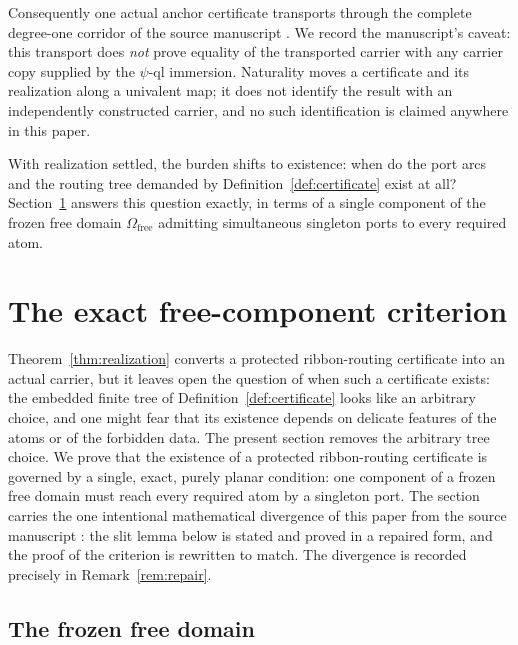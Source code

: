 \documentclass[11pt,reqno]{amsart}
\theoremstyle{definition}
\theoremstyle{remark}
\newcommand{\Omfree}{\Omega_{\mathrm{free}}}
\begin{document}
Consequently one actual anchor certificate transports through the
complete degree-one corridor of the source manuscript \cite{MWman}.  We
record the manuscript's caveat: this transport does \emph{not} prove
equality of the transported carrier with any carrier copy supplied by the
$\psi$-ql immersion.  Naturality moves a certificate and its realization
along a univalent map; it does not identify the result with an
independently constructed carrier, and no such identification is claimed
anywhere in this paper.

With realization settled, the burden shifts to existence: when do the
port arcs and the routing tree demanded by
Definition~\ref{def:certificate} exist at all?
Section~\ref{sec:criterion} answers this question exactly, in terms of a
single component of the frozen free domain $\Omfree$ admitting
simultaneous singleton ports to every required atom.


\section{The exact free-component criterion}\label{sec:criterion}

Theorem~\ref{thm:realization} converts a protected ribbon-routing certificate into an
actual carrier, but it leaves open the question of when such a certificate exists: the
embedded finite tree of Definition~\ref{def:certificate} looks like an arbitrary choice,
and one might fear that its existence depends on delicate features of the atoms or of the
forbidden data. The present section removes the arbitrary tree choice. We prove that the
existence of a protected ribbon-routing certificate is governed by a single, exact,
purely planar condition: one component of a frozen free domain must reach every required
atom by a singleton port. The section carries the one intentional mathematical divergence
of this paper from the source manuscript \cite{MWman}: the slit lemma below is stated and
proved in a repaired form, and the proof of the criterion is rewritten to match. The
divergence is recorded precisely in Remark~\ref{rem:repair}.

\subsection{The frozen free domain}\label{subsec:D-frozen}
\end{document}
